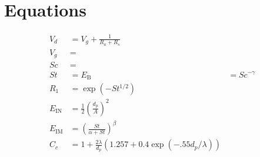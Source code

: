 \documentclass{article}
\begin{document}

\section{Equations}
\label{sec:equations}

\begin{align}
V_d &= V_g + \frac{1}{R_a + R_s} \\
V_g & = \\
Sc &= \\
St &= 
E_{\textrm{B}} &= Sc^{-\gamma}  \\
R_1 &= \exp(-St^{1/2}) \\
E_{\textrm{IN}} &= \frac{1}{2} \left(\frac{d_p}{A}\right)^2 \\
E_{\textrm{IM}} & = \left(\frac{St}{\alpha + St}\right)^{\beta} \\
C_c & = 1 + \frac{2 \lambda}{d_p}\left(1.257 + 0.4\exp(-.55d_p/\lambda)\right)\\ 
\end{align}
\end{document}
